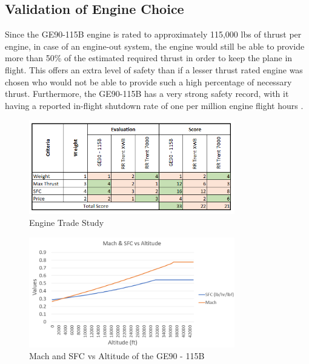 

\subsection{Validation of Engine Choice}

Since the GE90-115B engine is rated to approximately 115,000 lbs of thrust per engine, in case of an engine-out system, the engine would still be able to provide more than 50\% of the estimated required thrust in order to keep the plane in flight. This offers an extra level of safety than if a lesser thrust rated engine was chosen who would not be able to provide such a high percentage of necessary thrust. Furthermore, the GE90-115B has a very strong safety record, with it having a reported in-flight shutdown rate of one per million engine flight hours \cite{geifsd}. 

\begin{figure} [h!]
    \centering
    \includegraphics[width=0.8\textwidth]{Photos/GE90Trade.PNG}
    \caption{Engine Trade Study}
    \label{fig:enginetrade}
\end{figure}

\begin{figure} [h!]
    \centering
    \includegraphics[width=0.8\textwidth]{Photos/machvssfc.PNG}
    \caption{Mach and SFC vs Altitude of the GE90 - 115B}
    \label{fig:machvssfc}
\end{figure}

